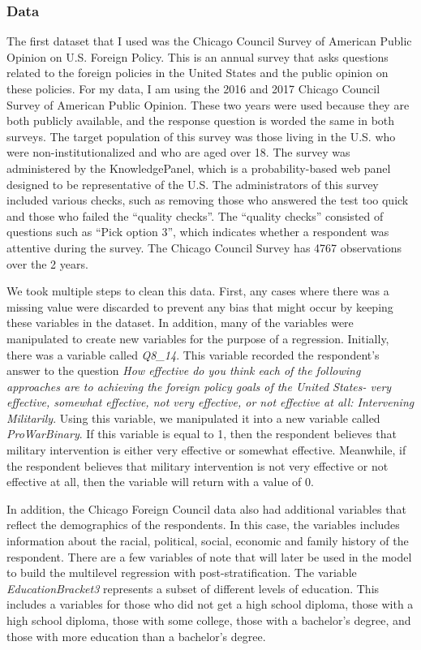 \documentclass[
  11pt,
]{article}
\begin{document}
\hypertarget{data}{%
\subsubsection{Data}\label{data}}

The first dataset that I used was the Chicago Council Survey of American
Public Opinion on U.S. Foreign Policy. This is an annual survey that
asks questions related to the foreign policies in the United States and
the public opinion on these policies. For my data, I am using the 2016
and 2017 Chicago Council Survey of American Public Opinion. These two
years were used because they are both publicly available, and the
response question is worded the same in both surveys. The target
population of this survey was those living in the U.S. who were
non-institutionalized and who are aged over 18. The survey was
administered by the KnowledgePanel, which is a probability-based web
panel designed to be representative of the U.S. The administrators of
this survey included various checks, such as removing those who answered
the test too quick and those who failed the ``quality checks''. The
``quality checks'' consisted of questions such as ``Pick option 3'',
which indicates whether a respondent was attentive during the survey.
The Chicago Council Survey has 4767 observations over the 2 years.

We took multiple steps to clean this data. First, any cases where there
was a missing value were discarded to prevent any bias that might occur
by keeping these variables in the dataset. In addition, many of the
variables were manipulated to create new variables for the purpose of a
regression. Initially, there was a variable called \emph{Q8\_14}. This
variable recorded the respondent's answer to the question \emph{How
effective do you think each of the following approaches are to achieving
the foreign policy goals of the United States- very effective, somewhat
effective, not very effective, or not effective at all: Intervening
Militarily}. Using this variable, we manipulated it into a new variable
called \emph{ProWarBinary}. If this variable is equal to 1, then the
respondent believes that military intervention is either very effective
or somewhat effective. Meanwhile, if the respondent believes that
military intervention is not very effective or not effective at all,
then the variable will return with a value of 0.

In addition, the Chicago Foreign Council data also had additional
variables that reflect the demographics of the respondents. In this
case, the variables includes information about the racial, political,
social, economic and family history of the respondent. There are a few
variables of note that will later be used in the model to build the
multilevel regression with post-stratification. The variable
\emph{EducationBracket3} represents a subset of different levels of
education. This includes a variables for those who did not get a high
school diploma, those with a high school diploma, those with some
college, those with a bachelor's degree, and those with more education
than a bachelor's degree.
\end{document}
